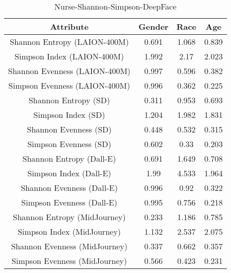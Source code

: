 \begin{table}[h]
\centering
\begin{tabular}{|c|c|c|c|}
\hline 
Attribute & Gender & Race & Age\\
\hline
Shannon Entropy (LAION-400M) & 0.691  &  1.068  &  0.839 \\
Simpson Index (LAION-400M) & 1.992  &  2.17  &  2.023 \\
Shannon Evenness (LAION-400M) & 0.997  &  0.596  &  0.382 \\
Simpson Evenness (LAION-400M) & 0.996  &  0.362  &  0.225 \\
\hline
Shannon Entropy (SD) & 0.311  &  0.953  &  0.693 \\
Simpson Index (SD) & 1.204  &  1.982  &  1.831 \\
Shannon Evenness (SD) & 0.448  &  0.532  &  0.315 \\
Simpson Evenness (SD) & 0.602  &  0.33  &  0.203 \\
\hline 
Shannon Entropy (Dall-E) & 0.691  &  1.649  &  0.708 \\
Simpson Index (Dall-E) & 1.99  &  4.533  &  1.964 \\
Shannon Evenness (Dall-E) & 0.996  &  0.92  &  0.322 \\
Simpson Evenness (Dall-E) & 0.995  &  0.756  &  0.218 \\
\hline 
Shannon Entropy (MidJourney) & 0.233  &  1.186  &  0.785 \\
Simpson Index (MidJourney) & 1.132  &  2.537  &  2.075 \\
Shannon Evenness (MidJourney) & 0.337  &  0.662  &  0.357 \\
Simpson Evenness (MidJourney) & 0.566  &  0.423  &  0.231 \\
\hline
\end{tabular}
\caption{Nurse-Shannon-Simpson-DeepFace}
\label{tab:nurse-shannon-simpson-deepFace}
\end{table}

